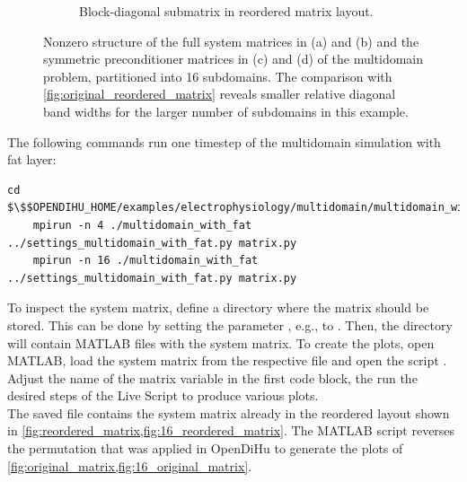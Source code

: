 \begin{figure}
\begin{subfigure}[t]{0.49\textwidth}
    \caption{Block-diagonal submatrix in reordered matrix layout.}%
    \label{fig:16_reordered_diagonal_matrix}%
  \end{subfigure}
  \caption{Nonzero structure of the full system matrices in (a) and (b) and the symmetric preconditioner matrices in (c) and (d) of the multidomain problem, partitioned into 16 subdomains. The comparison with \cref{fig:original_reordered_matrix} reveals smaller relative diagonal band widths for the larger number of subdomains in this example.}%
  \label{fig:16_original_reordered_diagonal_matrix}%
\end{figure}%

\begin{reproduce_no_break}
  The following commands run one timestep of the multidomain simulation with fat layer:
  \begin{lstlisting}[columns=fullflexible,breaklines=true,postbreak=\mbox{\textcolor{gray}{$\hookrightarrow$}\space}]
    cd $\$$OPENDIHU_HOME/examples/electrophysiology/multidomain/multidomain_with_fat/build_release
    mpirun -n 4 ./multidomain_with_fat ../settings_multidomain_with_fat.py matrix.py
    mpirun -n 16 ./multidomain_with_fat ../settings_multidomain_with_fat.py matrix.py
  \end{lstlisting}
  To inspect the system matrix, define a directory where the matrix should be stored. This can be done by setting the parameter \code{config[`Solvers`][`multidomainLinear}\code{Solver`][`dumpFilename`]}, e.g., to . Then, the directory  will contain MATLAB files with the system matrix. To create the plots, open MATLAB, load the system matrix from the  respective file and open the script . Adjust the name of the matrix variable in the first code block, the run the desired steps of the Live Script to produce various plots.\\
  The saved file contains the system matrix already in the reordered layout shown in \cref{fig:reordered_matrix,fig:16_reordered_matrix}. The MATLAB script reverses the permutation that was applied in OpenDiHu to generate the plots of \cref{fig:original_matrix,fig:16_original_matrix}.
\end{reproduce_no_break}

